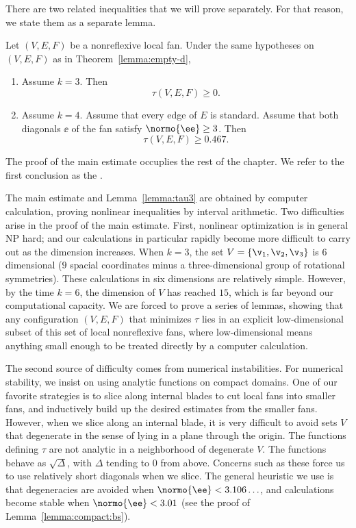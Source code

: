 There are two related inequalities that we will prove separately. For that reason,
we state them as a separate lemma.

\begin{lemma}\label{lemma:tau3}
Let $(V,E,F)$ be a nonreflexive local fan.
Under the same hypotheses on $(V,E,F)$ as in Theorem~\ref{lemma:empty-d}, 
\begin{enumerate}
\item Assume $k=3$. Then
\[\tau(V,E,F)\ge 0.\]
\item Assume $k=4$.  Assume that every edge of $E$ is standard.
Assume that both diagonals $\ee$ of the fan satisfy $\normo{\ee}\ge3$.
Then
\[
\tau(V,E,F)\ge 0.467.
\]
\end{enumerate}
\end{lemma}

The proof of the main estimate occuplies the rest of the chapter.
We refer to the first conclusion as the .  

The main estimate and Lemma~\ref{lemma:tau3} are obtained by computer
calculation, proving nonlinear inequalities by interval arithmetic.
Two  difficulties
arise in the proof of  the main estimate.  First, nonlinear optimization is
in general NP hard; and our calculations in particular rapidly become
more difficult to carry out as the dimension increases.  When $k=3$,
the set $V=\{\v_1,\v_2,\v_3\}$ is $6$ dimensional ($9$ spacial
coordinates minus a three-dimensional group of rotational symmetries).
These calculations in six dimensions are relatively simple.  However,
by the time $k=6$, the dimension of $V$ has reached $15$, which is far
beyond our computational capacity.  We are forced to prove a series of
lemmas, showing that any configuration $(V,E,F)$ that minimizes $\tau$
lies in an explicit low-dimensional subset of this set of local
nonreflexive fans, where low-dimensional means anything small enough
to be treated directly by a computer calculation.

The second source of difficulty comes from numerical instabilities.
For numerical stability, we insist on using analytic functions on
compact domains.  One of our favorite strategies is to slice along
internal blades to cut local fans into smaller fans, and inductively
build up the desired estimates from the smaller fans.  However, when
we slice along an internal blade, it is very difficult to avoid sets
$V$ that degenerate in the sense of lying in a plane through the
origin.  The functions defining $\tau$ are not analytic in a
neighborhood of degenerate $V$.  The functions behave as
$\sqrt{\Delta}$, with $\Delta$ tending to $0$ from above.  Concerns
such as these force us to use relatively short diagonals when we
slice.  The general heuristic we use is that degeneracies are avoided when
$\normo{\ee}< 3.106\ldots$, and calculations become stable
when $\normo{\ee}<3.01$  (see the proof of
Lemma~\ref{lemma:compact:bs}).

